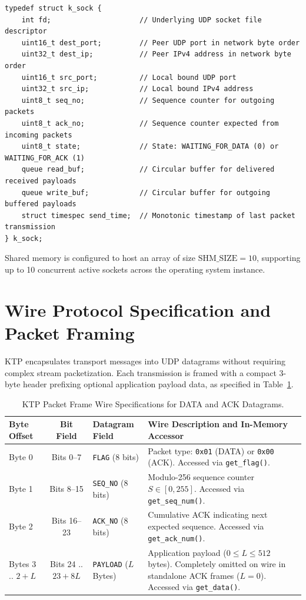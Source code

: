 \documentclass[11pt,a4paper]{article}
\begin{document}
\begin{lstlisting}[caption={KTP Socket Control Block Definition}]
typedef struct k_sock {
    int fd;                     // Underlying UDP socket file descriptor
    uint16_t dest_port;         // Peer UDP port in network byte order
    uint32_t dest_ip;           // Peer IPv4 address in network byte order
    uint16_t src_port;          // Local bound UDP port
    uint32_t src_ip;            // Local bound IPv4 address
    uint8_t seq_no;             // Sequence counter for outgoing packets
    uint8_t ack_no;             // Sequence counter expected from incoming packets
    uint8_t state;              // State: WAITING_FOR_DATA (0) or WAITING_FOR_ACK (1)
    queue read_buf;             // Circular buffer for delivered received payloads
    queue write_buf;            // Circular buffer for outgoing buffered payloads
    struct timespec send_time;  // Monotonic timestamp of last packet transmission
} k_sock;
\end{lstlisting}

Shared memory is configured to host an array of size $\text{SHM\_SIZE} = 10$, supporting up to 10 concurrent active sockets across the operating system instance.

\clearpage
\section{Wire Protocol Specification and Packet Framing}
\label{sec:wire_protocol}

KTP encapsulates transport messages into UDP datagrams without requiring complex stream packetization. Each transmission is framed with a compact 3-byte header prefixing optional application payload data, as specified in Table~\ref{tab:packet_format}.

\begin{table}[htbp]
\centering
\small
\caption{KTP Packet Frame Wire Specifications for DATA and ACK Datagrams.}
\label{tab:packet_format}
\begin{tabularx}{\textwidth}{lcp{3.2cm}X}
\toprule
\textbf{Byte Offset} & \textbf{Bit Field} & \textbf{Datagram Field} & \textbf{Wire Description and In-Memory Accessor} \\
\midrule
Byte 0 & Bits 0--7 & \texttt{FLAG} (8 bits) & Packet type: \texttt{0x01} (DATA) or \texttt{0x00} (ACK). Accessed via \texttt{get\_flag()}. \\
Byte 1 & Bits 8--15 & \texttt{SEQ\_NO} (8 bits) & Modulo-256 sequence counter $S \in [0, 255]$. Accessed via \texttt{get\_seq\_num()}. \\
Byte 2 & Bits 16--23 & \texttt{ACK\_NO} (8 bits) & Cumulative ACK indicating next expected sequence. Accessed via \texttt{get\_ack\_num()}. \\
Bytes 3 .. $2+L$ & Bits 24 .. $23+8L$ & \texttt{PAYLOAD} ($L$ Bytes) & Application payload ($0 \le L \le 512$ bytes). Completely omitted on wire in standalone ACK frames ($L=0$). Accessed via \texttt{get\_data()}. \\
\bottomrule
\end{tabularx}
\end{table}
\end{document}
